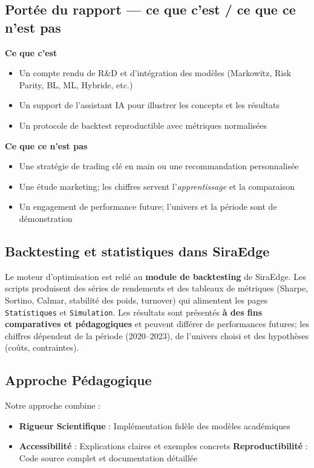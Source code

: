 \documentclass[11pt,a4paper]{article}
\begin{document}
\subsection*{Portée du rapport — ce que c'est / ce que ce n'est pas}
\textbf{Ce que c'est}
\begin{itemize}
  \item Un compte rendu de R\&D et d'intégration des modèles (Markowitz, Risk Parity, BL, ML, Hybride, etc.)
  \item Un support de l'assistant IA pour illustrer les concepts et les résultats
  \item Un protocole de backtest reproductible avec métriques normalisées
\end{itemize}
\textbf{Ce que ce n'est pas}
\begin{itemize}
  \item Une stratégie de trading clé en main ou une recommandation personnalisée
  \item Une étude marketing; les chiffres servent l'\emph{apprentissage} et la comparaison
  \item Un engagement de performance future; l'univers et la période sont de démonstration
\end{itemize}

\subsection*{Backtesting et statistiques dans SiraEdge}
Le moteur d'optimisation est relié au \textbf{module de backtesting} de SiraEdge. Les scripts produisent des séries de rendements et des tableaux de métriques (Sharpe, Sortino, Calmar, stabilité des poids, turnover) qui alimentent les pages \texttt{Statistiques} et \texttt{Simulation}. Les résultats sont présentés \textbf{à des fins comparatives et pédagogiques} et peuvent différer de performances futures; les chiffres dépendent de la période (2020--2023), de l'univers choisi et des hypothèses (coûts, contraintes).

\subsection*{Approche Pédagogique}
Notre approche combine :
\begin{itemize}
    \item \textbf{Rigueur Scientifique} : Implémentation fidèle des modèles académiques
    \item \textbf{Accessibilité} : Explications claires et exemples concrets
    \textbf{Reproductibilité} : Code source complet et documentation détaillée
\end{itemize}
\end{document}
